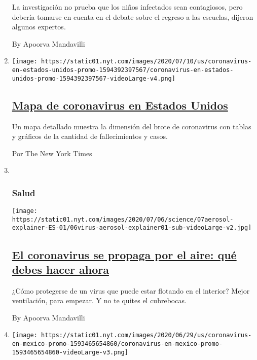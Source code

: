 \begin{enumerate}
  La investigación no prueba que los niños infectados sean contagiosos,
  pero debería tomarse en cuenta en el debate sobre el regreso a las
  escuelas, dijeron algunos expertos.

  By Apoorva Mandavilli
\item
  \texttt{[image: https://static01.nyt.com/images/2020/07/10/us/coronavirus-en-estados-unidos-promo-1594392397567/coronavirus-en-estados-unidos-promo-1594392397567-videoLarge-v4.png]}

  \hypertarget{mapa-de-coronavirus-en-estados-unidos}{%
  \subsection{\texorpdfstring{\href{/es/interactive/2020/espanol/mundo/coronavirus-en-estados-unidos.html}{Mapa
  de coronavirus en Estados
  Unidos}}{Mapa de coronavirus en Estados Unidos}}\label{mapa-de-coronavirus-en-estados-unidos}}

  Un mapa detallado muestra la dimensión del brote de coronavirus con
  tablas y gráficos de la cantidad de fallecimientos y casos.

  Por The New York Times
\item ~
  \hypertarget{salud}{%
  \subsubsection{Salud}\label{salud}}

  \texttt{[image: https://static01.nyt.com/images/2020/07/06/science/07aerosol-explainer-ES-01/06virus-aerosol-explainer01-sub-videoLarge-v2.jpg]}

  \hypertarget{el-coronavirus-se-propaga-por-el-aire-quuxe9-debes-hacer-ahora}{%
  \subsection{\texorpdfstring{\href{/es/2020/07/08/espanol/ciencia-y-tecnologia/coronavirus-aire-aerosoles.html}{El
  coronavirus se propaga por el aire: qué debes hacer
  ahora}}{El coronavirus se propaga por el aire: qué debes hacer ahora}}\label{el-coronavirus-se-propaga-por-el-aire-quuxe9-debes-hacer-ahora}}

  ¿Cómo protegerse de un virus que puede estar flotando en el interior?
  Mejor ventilación, para empezar. Y no te quites el cubrebocas.

  By Apoorva Mandavilli
\item
  \texttt{[image: https://static01.nyt.com/images/2020/06/29/us/coronavirus-en-mexico-promo-1593465654860/coronavirus-en-mexico-promo-1593465654860-videoLarge-v3.png]}


\end{enumerate}
